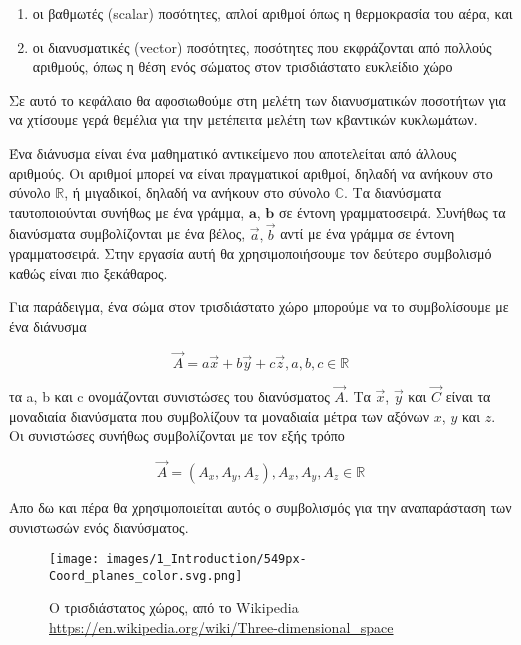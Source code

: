 \begin{enumerate}
    \item οι βαθμωτές (scalar) ποσότητες, απλοί αριθμοί όπως η θερμοκρασία του αέρα, και
    \item οι διανυσματικές (vector) ποσότητες, ποσότητες που εκφράζονται από πολλούς αριθμούς, όπως η θέση ενός σώματος στον τρισδιάστατο ευκλείδιο χώρο
\end{enumerate}

Σε αυτό το κεφάλαιο θα αφοσιωθούμε στη μελέτη των διανυσματικών ποσοτήτων για να χτίσουμε γερά θεμέλια για την μετέπειτα μελέτη
των κβαντικών κυκλωμάτων.

Ένα διάνυσμα είναι ένα μαθηματικό αντικείμενο που αποτελείται από άλλους αριθμούς. Οι αριθμοί μπορεί να είναι πραγματικοί αριθμοί,
δηλαδή να ανήκουν στο σύνολο $\mathbb{R}$, ή μιγαδικοί, δηλαδή να ανήκουν στο σύνολο $\mathbb{C}$. Τα διανύσματα ταυτοποιούνται συνήθως
με ένα γράμμα, $\mathbf{a}$, $\mathbf{b}$ σε έντονη γραμματοσειρά. Συνήθως τα διανύσματα συμβολίζονται με ένα βέλος, $\vec{a}, \vec{b}$
αντί με ένα γράμμα σε έντονη γραμματοσειρά. Στην εργασία αυτή θα χρησιμοποιήσουμε τον δεύτερο συμβολισμό καθώς είναι πιο ξεκάθαρος.

Για παράδειγμα, ένα σώμα στον τρισδιάστατο χώρο μπορούμε να το συμβολίσουμε με ένα διάνυσμα

\begin{equation}
    \vec{A} = a\vec{x} + b\vec{y} + c\vec{z}, a,b,c \in \mathbb{R}
\end{equation}

τα a, b και c ονομάζονται συνιστώσες του διανύσματος $\vec{A}$. Τα $\vec{x}$, $\vec{y}$ και $\vec{C}$ είναι τα μοναδιαία διανύσματα
που συμβολίζουν τα μοναδιαία μέτρα των αξόνων $x$, $y$ και $z$. Οι συνιστώσες συνήθως συμβολίζονται με τον εξής τρόπο

\begin{equation}
    \vec{A} = (A_x, A_y, A_z), A_x, A_y, A_z \in \mathbb{R}
\end{equation}

Απο δω και πέρα θα χρησιμοποιείται αυτός ο συμβολισμός για την αναπαράσταση των συνιστωσών ενός διανύσματος.

\begin{figure}[ht]
    \texttt{[image: images/1\_Introduction/549px-Coord\_planes\_color.svg.png]}
    \caption{Ο τρισδιάστατος χώρος, από το Wikipedia \url{https://en.wikipedia.org/wiki/Three-dimensional_space}}
\end{figure}

